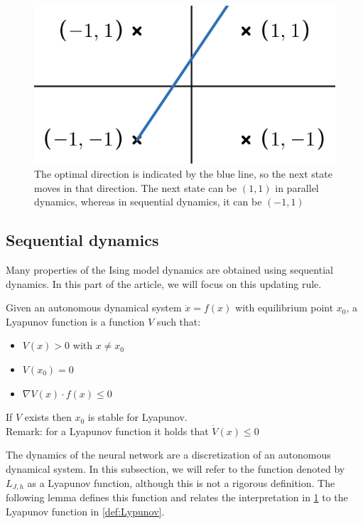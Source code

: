 \begin{figure}[ht]
    \centering
    \includegraphics[width=0.5\linewidth]{Figures/DiscreteGradient.png}
    \caption{The optimal direction is indicated by the blue line, so the next state moves in that direction. The next state can be $(1,1)$ in parallel dynamics, whereas in sequential dynamics, it can be $(-1,1)$}
    \label{fig:discrete_gradient}
\end{figure}

\subsection{Sequential dynamics}
Many properties of the Ising model dynamics are obtained using sequential dynamics. In this part of the article, we will focus on this updating rule.

\begin{definition}
    \label{def:Lypunov}
    Given an autonomous dynamical system $\dot{x} = f(x)$ with equilibrium point $x_0$, a Lyapunov function is a function $V$ such that:
    \begin{itemize}[itemsep=2pt, topsep=10pt]
        \item $V(x) > 0$ with $x\neq x_0$
        \item $V(x_0) = 0$
        \item $\nabla V(x) \cdot f(x) \leq 0$
    \end{itemize}
    If $V$ exists then $x_0$ is stable for Lyapunov.\\ Remark: for a Lyapunov function it holds that $\dot{V}\left(x\right) \leq 0$
\end{definition}

\bigskip\noindent The dynamics of the neural network are a discretization of an autonomous dynamical system. In this subsection, we will refer to the function denoted by $L_{J,h}$ as a Lyapunov function, although this is not a rigorous definition. The following lemma defines this function and relates the interpretation in \cref{fig:discrete_gradient} to the Lyapunov function in \cref{def:Lypunov}.

